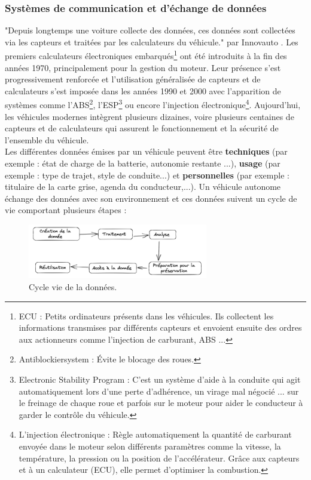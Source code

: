 \subsubsection{Systèmes de communication et d’échange de données}
"Depuis longtemps une voiture collecte des données, ces données sont collectées via les capteurs et traitées par les calculateurs du véhicule." par Innovauto \cite{donnees_echange}. Les premiers calculateurs électroniques embarqués\footnote{ECU : Petits ordinateurs présents dans les véhicules. Ils collectent les informations transmises par différents capteurs et envoient ensuite des ordres aux actionneurs comme l'injection de carburant, ABS ...} ont été introduits à la fin des années 1970, principalement pour la gestion du moteur. Leur présence s’est progressivement renforcée et l’utilisation généralisée de capteurs et de calculateurs s’est imposée dans les années 1990 et 2000 avec l’apparition de systèmes comme l’ABS\footnote{Antiblockiersystem : Évite le blocage des roues.}, l’ESP\footnote{Electronic Stability Program : C'est un système d’aide à la conduite qui agit automatiquement lors d'une perte d’adhérence, un virage mal négocié ... sur le freinage de chaque roue et parfois sur le moteur pour aider le conducteur à garder le contrôle du véhicule.} ou encore l’injection électronique\footnote{L’injection électronique : Règle automatiquement la quantité de carburant envoyée dans le moteur selon différents paramètres comme la vitesse, la température, la pression ou la position de l’accélérateur. Grâce aux capteurs et à un calculateur (ECU), elle permet d’optimiser la combustion.}. Aujourd’hui, les véhicules modernes intègrent plusieurs dizaines, voire plusieurs centaines de capteurs et de calculateurs qui assurent le fonctionnement et la sécurité de l’ensemble du véhicule. \\
Les différentes données émises par un véhicule peuvent être \textbf{techniques} (par exemple : état de charge de la batterie, autonomie restante ...), \textbf{usage} (par exemple : type de trajet, style de conduite...) et \textbf{personnelles} (par exemple : titulaire de la carte grise, agenda du conducteur,...).
Un véhicule autonome échange des données avec son environnement et ces données suivent un cycle de vie comportant plusieurs étapes :
\begin{figure}[H]
    \centering
    \includegraphics[width=0.7\textwidth]{images/schéma_cycle_vie_donneées.png} 
    \caption{Cycle vie de la données.}
\end{figure}

